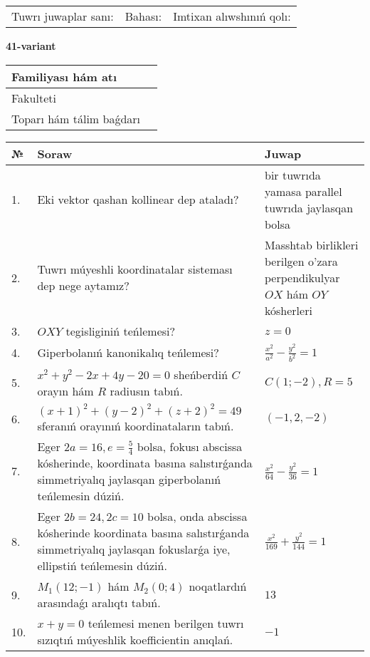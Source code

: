 \documentclass{article}
\begin{document}
\vspace{1cm}

\begin{tabular}{lll}
Tuwrı juwaplar sanı: \underline{\hspace{1.5cm}} & 
Bahası: \underline{\hspace{1.5cm}} & 
Imtixan alıwshınıń qolı: \underline{\hspace{2cm}} \\
\end{tabular}

\egroup

\newpage


\textbf{41-variant}\\

\bgroup
\def\arraystretch{1.6} %

\begin{tabular}{|m{5.7cm}|m{9.5cm}|}
\hline
Familiyası hám atı & \\
\hline
Fakulteti  & \\
\hline
Toparı hám tálim baǵdarı  & \\
\hline
\end{tabular}

\vspace{1cm}

\begin{tabular}{|m{0.7cm}|m{10cm}|m{4cm}|}
\hline
№ & Soraw & Juwap \\
\hline
1. & Eki vektor qashan kollinear dep ataladı? & bir tuwrıda yamasa parallel tuwrıda jaylasqan bolsa \\
\hline
2. & Tuwrı múyeshli koordinatalar sisteması dep nege aytamız? & Masshtab birlikleri berilgen o'zara perpendikulyar $OX$ hám $OY$ kósherleri \\
\hline
3. & $OXY$ tegisliginiń teńlemesi? & $z=0$ \\
\hline
4. & Giperbolanıń kanonikalıq teńlemesi? & $\frac{x^2}{a^2}-\frac{y^2}{b^2}=1$ \\
\hline
5. & $x^{2}+y^{2}-2x+4y-20=0$ sheńberdiń $C$ orayın hám $R$ radiusın tabıń. & $C(1;-2), R=5$ \\
\hline
6. & $(x+1)^{2}+(y-2) ^{2}+(z+2) ^{2}=49$ sferanıń orayınıń koordinataların tabıń. & $(-1,2,-2)$ \\
\hline
7. & Eger $2a=16, e=\frac{5}{4}$ bolsa, fokusı abscissa kósherinde, koordinata basına salıstırǵanda simmetriyalıq jaylasqan giperbolanıń teńlemesin dúziń. & $\frac{x^{2}}{64}-\frac{y^{2}}{36}=1$ \\
\hline
8. & Eger $2b=24, 2 c=10$ bolsa, onda abscissa kósherinde koordinata basına salıstırǵanda simmetriyalıq jaylasqan fokuslarǵa iye, ellipstiń teńlemesin dúziń. & $\frac{x^{2}}{169}+\frac{y^{2}}{144}=1$ \\
\hline
9. & $M_{1} (12;-1)$ hám $M_{2} (0;4)$ noqatlardıń arasındaǵı aralıqtı tabıń. & $13$ \\
\hline
10. & $x+y=0$ teńlemesi menen berilgen tuwrı sızıqtıń múyeshlik koefficientin anıqlań. & $- 1$ \\
\hline
\end{tabular}
\end{document}
